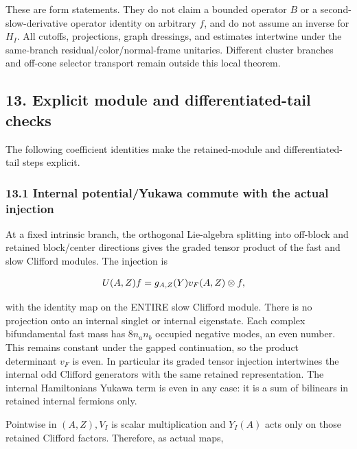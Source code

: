 These are form statements. They do not claim a bounded operator \(B\) or
a second-slow-derivative operator identity on arbitrary \(f\), and do
not assume an inverse for \(H_{I}\). All cutoffs, projections, graph
dressings, and estimates intertwine under the same-branch
residual/color/normal-frame unitaries. Different cluster branches and
off-cone selector transport remain outside this local theorem.

\subsection{13. Explicit module and differentiated-tail
checks}\label{i-explicit-module-and-differentiated-tail-checks}

The following coefficient identities make the retained-module and
differentiated-tail steps explicit.

\subsubsection{13.1 Internal potential/Yukawa commute with the actual
injection}\label{i-internal-potentialyukawa-commute-with-the-actual-injection}

At a fixed intrinsic branch, the orthogonal Lie-algebra splitting into
off-block and retained block/center directions gives the graded tensor
product of the fast and slow Clifford modules. The injection is

\begin{gather*}
\begin{aligned}
& U(A,Z)f = g_{A,Z}(Y) v_{F}(A,Z) \otimes  f,
\end{aligned}\notag
\end{gather*}

with the identity map on the ENTIRE slow Clifford module. There is no
projection onto an internal singlet or internal eigenstate. Each complex
bifundamental fast mass has \(8 n_{a} n_{b}\) occupied negative modes,
an even number. This remains constant under the gapped continuation, so
the product determinant \(v_{F}\) is even. In particular its graded
tensor injection intertwines the internal odd Clifford generators with
the same retained representation. The internal
Hamiltonian\textquotesingle s Yukawa term is even in any case: it is a
sum of bilinears in retained internal fermions only.

Pointwise in \((A,Z), V_{I}\) is scalar multiplication and \(Y_{I}(A)\)
acts only on those retained Clifford factors. Therefore, as actual maps,

